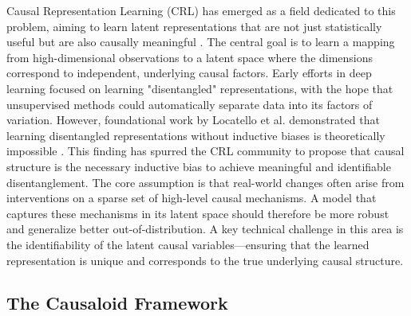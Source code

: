 {Causal Representation Learning (CRL) has emerged as a field dedicated to this problem, aiming to learn latent representations that are not just statistically useful but are also causally meaningful \cite{Scholkopf2021Toward}. The central goal is to learn a mapping from high-dimensional observations to a latent space where the dimensions correspond to independent, underlying causal factors.
Early efforts in deep learning focused on learning "disentangled" representations, with the hope that unsupervised methods could automatically separate data into its factors of variation. However, foundational work by Locatello et al. demonstrated that learning disentangled representations without inductive biases is theoretically impossible \cite{Locatello2019Challenging}. This finding has spurred the CRL community to propose that causal structure is the necessary inductive bias to achieve meaningful and identifiable disentanglement. The core assumption is that real-world changes often arise from interventions on a sparse set of high-level causal mechanisms. A model that captures these mechanisms in its latent space should therefore be more robust and generalize better out-of-distribution. A key technical challenge in this area is the identifiability of the latent causal variables—ensuring that the learned representation is unique and corresponds to the true underlying causal structure. 

\subsection{The Causaloid Framework}

}
